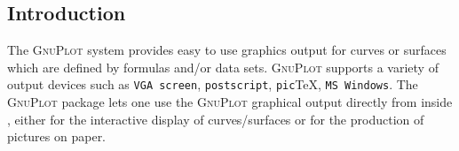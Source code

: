 



\newcommand{\Gnuplot}{\textsc{GnuPlot}}

\iffalse
\newpage
  Gnuplot
\newpage
\title{{\Gnuplot} Interface for REDUCE\\Version 4}
\author{Herbert Melenk \\
Konrad--Zuse--Zentrum f\"ur Informationstechnik Berlin \\
E--mail: Melenk@zib.de}
\maketitle

\fi



\subsection{Introduction}

The {\Gnuplot} system provides easy to use graphics output for curves or surfaces
which are defined by formulas and/or data sets.  {\Gnuplot} supports a variety of
output devices such as
\verb+VGA screen+, \verb+postscript+, \verb+pic+\TeX, \verb+MS Windows+.
The {\REDUCE} {\Gnuplot} package lets one use the {\Gnuplot} graphical output
directly from inside {\REDUCE}, either for the interactive display of
curves/surfaces or for the production of pictures on paper.

\iffalse
{\REDUCE} supports {\Gnuplot} 3.4 (or higher).  For DOS, Windows, Windows 95,
Windows NT, OS/2 and Unix versions of {\REDUCE} {\Gnuplot} binaries are delivered
together with {\REDUCE}\footnote{The {\Gnuplot} developers have agreed that {\Gnuplot}
binaries can be distributed together with {\REDUCE}.  As {\Gnuplot} is a package
distributed without cost, the {\Gnuplot} support of {\REDUCE} also is an add-on to
the {\REDUCE} kernel system without charge.  We recommend fetching the full
{\Gnuplot} system by anonymous FTP from a file server.  } %
. However, this is a basic set only.  If you intend to use more facilities of
the {\Gnuplot} system you should pick up the full {\Gnuplot} file tree
from \url{http://sourceforge.net/projects/gnuplot}.
\fi

